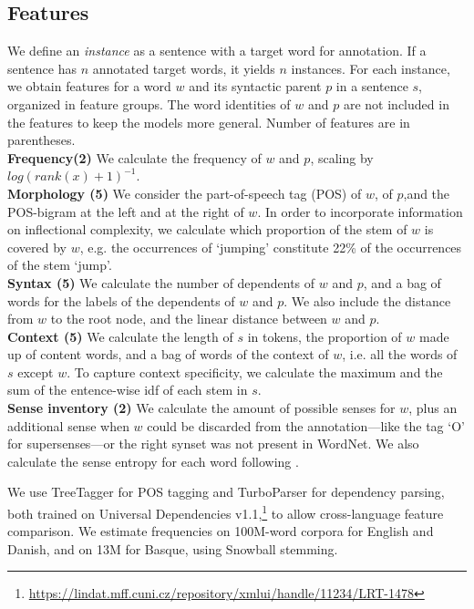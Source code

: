 \documentclass[11pt,a4paper]{article}
\begin{document}
\subsection{Features}
We define an \textit{instance} as a sentence with a target word for annotation. If a sentence has $n$ annotated target words, it yields $n$ instances. For each instance, we obtain features for a word $w$ and its syntactic parent $p$ in a sentence $s$, organized in feature groups. The word identities of $w$ and $p$ are not included in the features to keep the models more general. Number of features are in parentheses.\\ 
\noindent\textbf{Frequency(2)} We calculate the frequency of $w$ and $p$, scaling by $log(rank(x)+1)^{-1}$.\\
\textbf{ Morphology (5)} We consider the part-of-speech tag (POS) of $w$, of $p$,and the POS-bigram at the left and at the right of $w$. In order to incorporate information on inflectional complexity, we calculate which proportion of the stem of $w$ is covered by $w$, e.g. the occurrences of `jumping' constitute 22\% of the occurrences of the stem `jump'. \\
\textbf{Syntax (5)} We calculate the number of dependents of $w$ and $p$, and a bag of words for the labels of the dependents of $w$ and $p$. We also include the distance from $w$ to the root node, and the linear distance between $w$ and $p$.\\
\textbf{ Context  (5)} We calculate the length of $s$ in tokens, the proportion of $w$ made up of content words, and a bag of words of the context of $w$, i.e. all the words of $s$ except $w$. To capture context specificity, we calculate the maximum and the sum of the entence-wise idf of each stem in $s$. \\
\textbf{Sense inventory (2)} We calculate the amount of possible senses for $w$, plus an additional sense when $w$ could be discarded from the annotation---like the tag `O' for supersenses---or the right synset was not present in WordNet. We also calculate the sense entropy for each word following . 

 We use TreeTagger \cite{Schmid1994} for POS tagging and TurboParser \cite{Martins2010} for dependency parsing, both trained on Universal Dependencies v1.1,\footnote{\url{https://lindat.mff.cuni.cz/repository/xmlui/handle/11234/LRT-1478}} to allow cross-language feature comparison. %
 We estimate frequencies on 100M-word corpora for English and Danish, and on 13M for Basque, using Snowball stemming.
\end{document}
